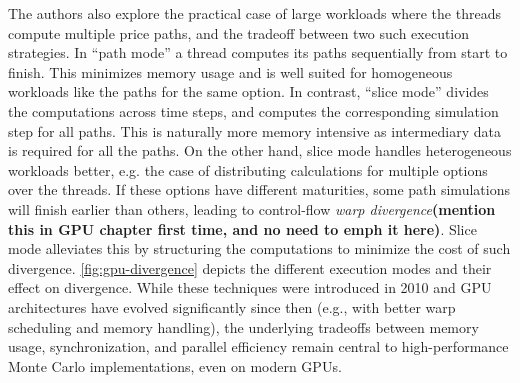 \documentclass[english,12pt,a4paper,pdftex,sci,utf8]{aaltothesis}
\begin{document}
The authors also explore the practical case of large workloads where the threads compute multiple price paths, and the tradeoff between two such execution strategies. In ``path mode'' a thread computes its paths sequentially from start to finish. This minimizes memory usage and is well suited for homogeneous workloads like the paths for the same option. In contrast, ``slice mode'' divides the computations across time steps, and computes the corresponding simulation step for all paths. This is naturally more memory intensive as intermediary data is required for all the paths. On the other hand, slice mode handles heterogeneous workloads better, e.g. the case of distributing calculations for multiple options over the threads. If these options have different maturities, some path simulations will finish earlier than others, leading to control-flow \emph{warp divergence}\textbf{(mention this in GPU chapter first time, and no need to emph it here)}. Slice mode alleviates this by structuring the computations to minimize the cost of such divergence. \cref{fig:gpu-divergence} depicts the different execution modes and their effect on divergence. While these techniques were introduced in 2010 and GPU architectures have evolved significantly since then (e.g., with better warp scheduling and memory handling), the underlying tradeoffs between memory usage, synchronization, and parallel efficiency remain central to high-performance Monte Carlo implementations, even on modern GPUs. \cite{liu2010efficient}
\end{document}
